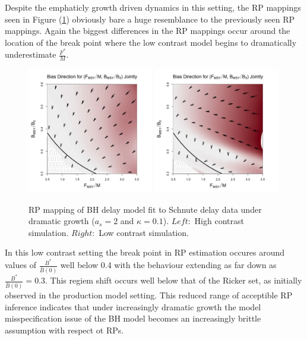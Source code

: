 %

%
Despite the emphaticly growth driven dynamics in this setting, the RP mappings 
seen in Figure (\ref{dramaticGrowth}) obviously bare a huge resemblance to the 
previously seen RP mappings. Again the biggest differences in the RP mappings 
occur around the location of the break point where the low contrast model 
begins to dramatically underestimate $\frac{F^*}{M}$.
\begin{figure}[h!]
\includegraphics[width=0.49\textwidth]{../ddBias/directionalBiasDDSubExpT45N150A0-1AS2K0.1.png}
\includegraphics[width=0.49\textwidth]{../ddBias/directionalBiasDDSubFlatT45N150A0-1AS2K0.1N84Edge.png}
\caption{
RP mapping of BH delay model fit to Schnute delay data under dramatic growth ($a_s=2$ and $\kappa=0.1$).
$Left:$ High contrast simulation.
$Right:$ Low contrast simulation.
}\label{dramaticGrowth}
\end{figure}
%
In this low contrast setting the break point in RP estimation occures around values of 
$\frac{B^*}{\bar B(0)}$ well below 0.4 with the behaviour extending as far down as 
$\frac{B^*}{\bar B(0)}=0.3$. This regiem shift occurs well below that of the Ricker 
set, as initially observed in the production model setting. 
This reduced range of acceptible RP inference indicates that under increasingly 
dramatic growth the model misspecification issue of the BH model becomes an 
increasingly brittle assumption with respect ot RPs.

